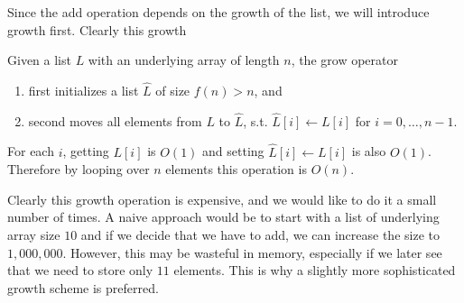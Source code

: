   Since the add operation depends on the growth of the list, we will introduce growth first. Clearly this growth 

  \begin{algo}
    Given a list $L$ with an underlying array of length $n$, the grow operator 
    \begin{enumerate}
      \item first initializes a list $\hat{L}$ of size $f(n) > n$, and 
      \item second moves all elements from $L$ to $\hat{L}$, s.t. $\hat{L}[i] \gets L[i]$ for $i = 0, \ldots, n-1$. 
    \end{enumerate}
    For each $i$, getting $L[i]$ is $O(1)$ and setting $\hat{L}[i] \gets L[i]$ is also $O(1)$. Therefore by looping over $n$ elements this operation is $O(n)$. 
  \end{algo} 

  Clearly this growth operation is expensive, and we would like to do it a small number of times. A naive approach would be to start with a list of underlying array size $10$ and if we decide that we have to add, we can increase the size to $1,000, 000$. However, this may be wasteful in memory, especially if we later see that we need to store only $11$ elements. This is why a slightly more sophisticated growth scheme is preferred.

